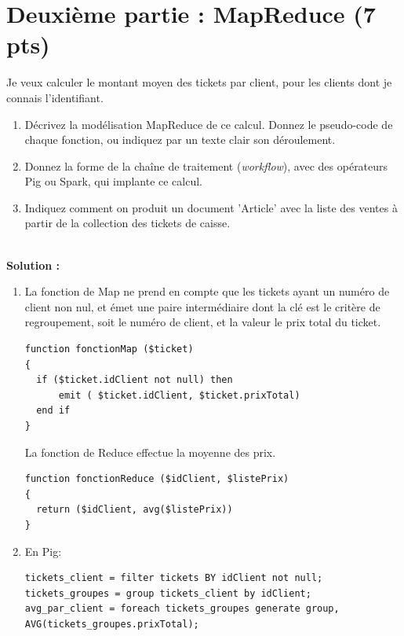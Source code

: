 \documentclass[11pt,a4paper]{article}
\newenvironment{solution}[0]{
~\\ \color{red} \textbf{Solution : }\color{black}}{%
}
\begin{document}
\section*{Deuxième partie : MapReduce (7 pts)}

Je veux calculer le montant moyen des tickets par client, pour les clients dont
je connais l'identifiant. 

\begin{enumerate}
 \item Décrivez la modélisation MapReduce de ce calcul. 
 Donnez le pseudo-code de chaque
fonction, ou indiquez par un texte clair son déroulement.
\item Donnez la forme de la chaîne de traitement (\textit{workflow}), avec des opérateurs Pig ou Spark,
      qui implante ce calcul.
   \item Indiquez comment on produit un document 'Article' avec la liste des ventes à partir de la
    collection des tickets de caisse.
\end{enumerate}


\begin{solution}

\begin{enumerate}
 
\item La fonction de Map  ne prend en compte que les tickets ayant un numéro de client non nul,
   et émet  une paire intermédiaire dont la clé est le critère de regroupement,
soit le numéro de client, et la valeur le prix total du ticket.

\begin{verbatim}
function fonctionMap ($ticket)
{
  if ($ticket.idClient not null) then
      emit ( $ticket.idClient, $ticket.prixTotal)
  end if
}
\end{verbatim}

La fonction de Reduce effectue la moyenne des prix.
\begin{verbatim}
function fonctionReduce ($idClient, $listePrix)
{
  return ($idClient, avg($listePrix))
}
\end{verbatim}

\item En Pig:

\begin{verbatim}
tickets_client = filter tickets BY idClient not null;
tickets_groupes = group tickets_client by idClient;
avg_par_client = foreach tickets_groupes generate group, AVG(tickets_groupes.prixTotal);
\end{verbatim}
\end{enumerate}
\end{solution}
\end{document}
